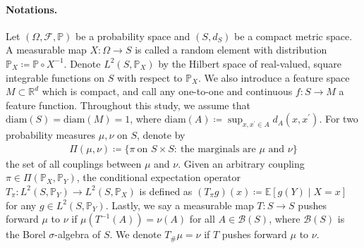 \documentclass{article}
\begin{document}
\paragraph{Notations.}
Let $(\Omega,\mathcal{F},\mathbb{P})$ be a probability space and $(S,d_S)$ be a compact metric space. 
A measurable map $X:\Omega\to S$ is called a random element with distribution $\mathbb{P}_X\coloneqq\mathbb{P}\circ X^{-1}$. Denote $L^2(S,\mathbb{P}_X)$ by the Hilbert space of real-valued, square integrable functions on $S$ with respect to $\mathbb{P}_X$.
We also introduce a feature space $M\subset\mathbb{R}^d$ which is compact, and call any one-to-one and continuous $f:S\to M$ a feature function. Throughout this study, we assume that $\mathrm{diam}(S) = \mathrm{diam}(M) = 1$, where $\mathrm{diam}(A) \coloneqq \sup_{x,x^\prime \in A}d_A(x,x^\prime)$. For two probability measures $\mu,\nu$ on $S$, denote by
\begin{align*}
	\Pi(\mu,\nu) \coloneqq \{\pi\ \text{on }S\times S:\ \text{the marginals are $\mu$ and $\nu$}\}
\end{align*}
the set of all couplings between $\mu$ and $\nu$. Given an arbitrary coupling $\pi \in \Pi(\mathbb{P}_X,\mathbb{P}_Y)$, the conditional expectation operator $T_{\pi}: L^2(S,\mathbb{P}_Y) \to L^2(S,\mathbb{P}_X)$ is defined as $(T_{\pi}g)(x) \coloneqq \mathbb{E}[g(Y) \mid X = x]$ for any $g \in L^2(S,\mathbb{P}_Y)$. Lastly, we say a measurable map $T: S \to S$ pushes forward $\mu$ to $\nu$ if $\mu(T^{-1}(A)) = \nu(A)$ for all $A \in \mathcal{B}(S)$, where $\mathcal{B}(S)$ is the Borel $\sigma$-algebra of $S$. We denote $T_{\#}\mu = \nu$ if $T$ pushes forward $\mu$ to $\nu$.

\end{document}
